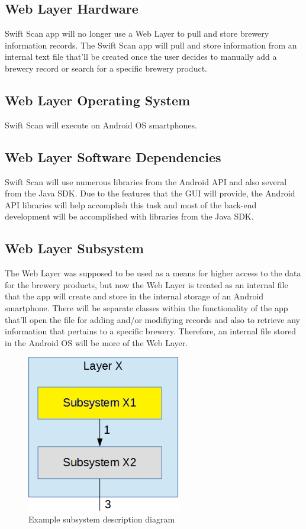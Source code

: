 
\subsection{Web Layer Hardware}
Swift Scan app will no longer use a Web Layer to pull and store brewery information records.  The Swift Scan app will pull and store information from an internal text file that'll be created once the user decides to manually add a brewery record or search for a specific brewery product.

\subsection{Web Layer Operating System}
Swift Scan will execute on Android OS smartphones.

\subsection{Web Layer Software Dependencies}
Swift Scan will use numerous libraries from the Android API and also several from the Java SDK.  Due to the features that the GUI will provide, the Android API libraries will help accomplish this task and most of the back-end development will be accomplished with libraries from the Java SDK.

\subsection{Web Layer Subsystem}
The Web Layer was supposed to be used as a means for higher access to the data for the brewery products, but now the Web Layer is treated as an internal file that the app will create and store in the internal storage of an Android smartphone.  There will be separate classes within the functionality of the app that'll open the file for adding and/or modifiying records and also to retrieve any information that pertains to a specific brewery.  Therefore, an internal file stored in the Android OS will be more of the Web Layer.

\begin{figure}[h!]
	\centering
 	\includegraphics[width=0.60\textwidth]{images/subsystem}
 \caption{Example subsystem description diagram}
\end{figure}

